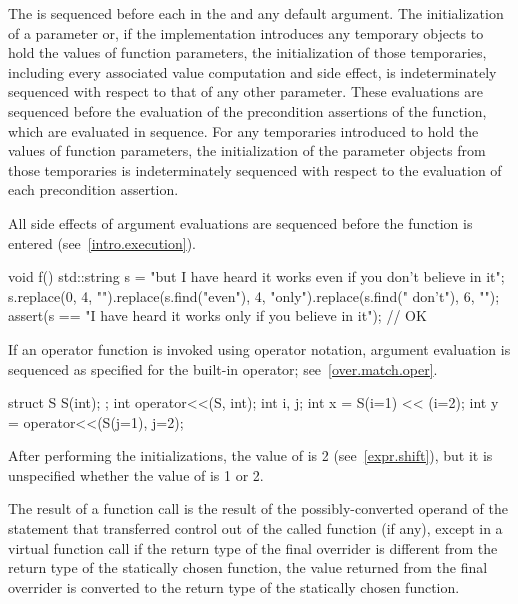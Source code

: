 \pnum
{}%
%
%
The  is sequenced before
each  in the 
and any default argument.
The initialization of a parameter or,
if the implementation introduces any temporary objects
to hold the values of function parameters,
the initialization of those temporaries,
including every associated value computation and side effect,
is indeterminately sequenced with respect to that of any other parameter.
These evaluations are
sequenced before
the evaluation of the precondition assertions of the function,
which are evaluated in sequence.
For any temporaries
introduced to hold the values of function parameters,
the initialization of the parameter objects from those temporaries
is indeterminately sequenced with respect to
the evaluation of each precondition assertion.
\begin{note}
All side effects of
argument evaluations are sequenced before the function is
entered (see~\ref{intro.execution}).
\end{note}
\begin{example}
\begin{codeblock}
void f() {
  std::string s = "but I have heard it works even if you don't believe in it";
  s.replace(0, 4, "").replace(s.find("even"), 4, "only").replace(s.find(" don't"), 6, "");
  assert(s == "I have heard it works only if you believe in it");       // OK
}
\end{codeblock}
\end{example}
\begin{note}
If an operator function is invoked
using operator notation,
argument evaluation is sequenced
as specified for the built-in operator;
see~\ref{over.match.oper}.
\end{note}
\begin{example}
\begin{codeblock}
struct S {
  S(int);
};
int operator<<(S, int);
int i, j;
int x = S(i=1) << (i=2);
int y = operator<<(S(j=1), j=2);
\end{codeblock}
After performing the initializations,
the value of  is 2 (see~\ref{expr.shift}),
but it is unspecified whether the value of  is 1 or 2.
\end{example}

\pnum
The result of a function call is the result of the possibly-converted operand
of the  statement
that transferred control out of the called function (if any),
except in a virtual function call if the return type of the
final overrider is different from the return type of the statically
chosen function, the value returned from the final overrider is
converted to the return type of the statically chosen function.

